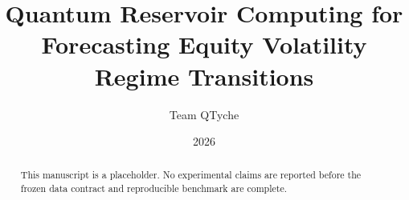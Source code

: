 \documentclass[10pt]{article}
\title{Quantum Reservoir Computing for Forecasting Equity Volatility Regime Transitions}
\author{Team QTyche}
\date{2026}
\begin{document}
\maketitle

\begin{abstract}
This manuscript is a placeholder. No experimental claims are reported before
the frozen data contract and reproducible benchmark are complete.
\end{abstract}



\end{document}
